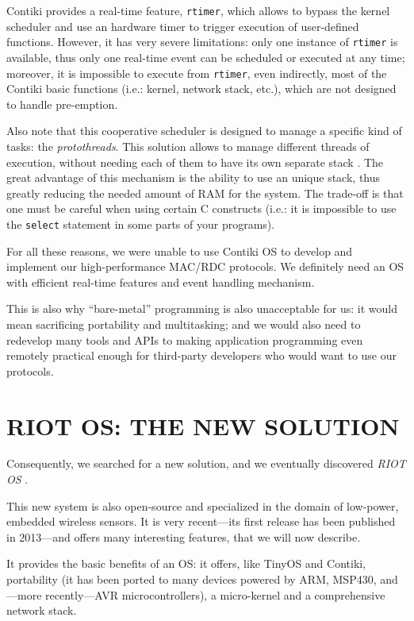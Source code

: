 \documentclass[a4paper,twoside]{article}
\begin{document}
Contiki provides a real-time feature, \texttt{rtimer}, which allows to bypass
the kernel scheduler and use an hardware timer to trigger execution of
user-defined functions. However, it has very severe limitations: only
one instance of \texttt{rtimer} is available, thus only one real-time
event can be scheduled or executed at any time; moreover, it is impossible
to execute from \texttt{rtimer}, even indirectly, most of the Contiki
basic functions (i.e.: kernel, network stack, etc.), which are not
designed to handle pre-emption.

Also note that this cooperative scheduler is designed to manage a specific
kind of tasks: the \emph{protothreads}. This solution allows to manage
different threads of execution, without needing each of them to have
its own separate stack \cite{Protothreads}. The great advantage of
this mechanism is the ability to use an unique stack, thus greatly
reducing the needed amount of RAM for the system. The trade-off is
that one must be careful when using certain C constructs (i.e.: it is
impossible to use the \texttt{select} statement in some parts of your
programs).

For all these reasons, we were unable to use Contiki OS to develop and
implement our high-performance MAC/RDC protocols. We definitely need
an OS with efficient real-time features and event handling mechanism.


This is also why ``bare-metal'' programming is also unacceptable for us:
it would mean sacrificing portability and multitasking; and we would also
need to redevelop many tools and APIs to making application programming
even remotely practical enough for third-party developers who would
want to use our protocols.


\section{\uppercase{RIOT OS: the new solution}}

Consequently, we searched for a new solution, and we eventually discovered
\emph{RIOT OS} \cite{RIOT}.

This new system is also open-source and specialized in the domain of
low-power, embedded wireless sensors. It is very recent---its first release
has been published in 2013---and offers many interesting features, that
we will now describe.

It provides the basic benefits of an OS: it offers, like TinyOS and Contiki,
portability (it has been ported to many devices powered by ARM, MSP430,
and---more recently---AVR microcontrollers), a micro-kernel and
a comprehensive network stack.
\end{document}
